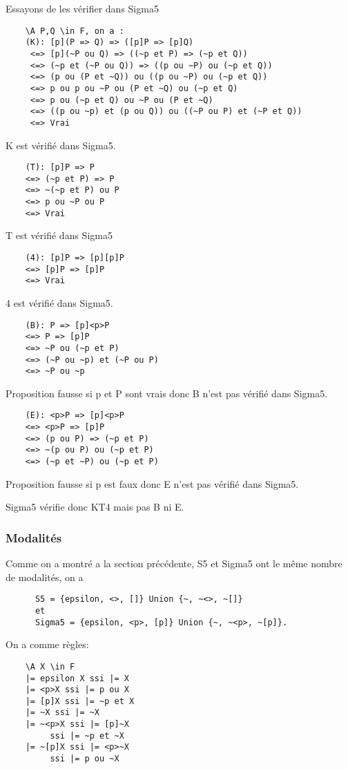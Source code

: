 \documentclass[a4paper,10pt]{article}
\begin{document}
   Essayons de les vérifier dans Sigma5
   \begin{lstlisting}
	\A P,Q \in F, on a :
	(K): [p](P => Q) => ([p]P => [p]Q)
	 <=> [p](~P ou Q) => ((~p et P) => (~p et Q))
	 <=> (~p et (~P ou Q)) => ((p ou ~P) ou (~p et Q))
	 <=> (p ou (P et ~Q)) ou ((p ou ~P) ou (~p et Q))
	 <=> p ou p ou ~P ou (P et ~Q) ou (~p et Q)
	 <=> p ou (~p et Q) ou ~P ou (P et ~Q)
	 <=> ((p ou ~p) et (p ou Q)) ou ((~P ou P) et (~P et Q))
	 <=> Vrai
   \end{lstlisting}
K est vérifié dans Sigma5.
   \begin{lstlisting}
	(T): [p]P => P 
	<=> (~p et P) => P
	<=> ~(~p et P) ou P
	<=> p ou ~P ou P
 	<=> Vrai
   \end{lstlisting}
T est vérifié dans Sigma5
   \begin{lstlisting}
	(4): [p]P => [p][p]P 
	<=> [p]P => [p]P
	<=> Vrai
   \end{lstlisting}
4 est vérifié dans Sigma5.
   \begin{lstlisting}
	(B): P => [p]<p>P 
	<=> P => [p]P
	<=> ~P ou (~p et P)
	<=> (~P ou ~p) et (~P ou P)
	<=> ~P ou ~p
   \end{lstlisting}
Proposition fausse si p et P sont vrais donc B n'est pas vérifié dans Sigma5.
   \begin{lstlisting}
	(E): <p>P => [p]<p>P
	<=> <p>P => [p]P
	<=> (p ou P) => (~p et P)
	<=> ~(p ou P) ou (~p et P)
	<=> (~p et ~P) ou (~p et P)
   \end{lstlisting}
        Proposition fausse si p est faux donc E n'est pas vérifié dans Sigma5.

Sigma5 vérifie donc KT4 mais pas B ni E.
   
   \subsubsection{Modalit\'{e}s}
      Comme on a montré a la section précédente, S5 et Sigma5 ont le même nombre de modalités, on a 
      \begin{lstlisting}
      S5 = {epsilon, <>, []} Union {~, ~<>, ~[]}
      et 
      Sigma5 = {epsilon, <p>, [p]} Union {~, ~<p>, ~[p]}.
      \end{lstlisting}
On a comme règles:
      \begin{lstlisting}
	\A X \in F
	|= epsilon X ssi |= X
	|= <p>X ssi |= p ou X
	|= [p]X ssi |= ~p et X
	|= ~X ssi |= ~X
	|= ~<p>X ssi |= [p]~X 
		 ssi |= ~p et ~X
	|= ~[p]X ssi |= <p>~X 
		 ssi |= p ou ~X
      \end{lstlisting}
      
\end{document}
